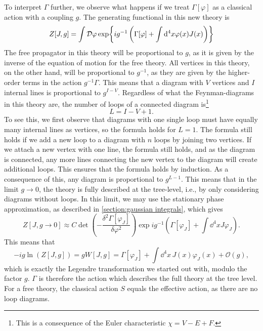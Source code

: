 To interpret $\Gamma$ further, we observe what happens if we treat $\Gamma[\varphi]$ as a classical action with a coupling $g$.
The generating functional in this new theory is
\begin{equation}
    \label{partition function with g}
    Z[J, g] = \int \mathcal{D} \varphi 
    \exp{ i g^{-1} \left( \Gamma[\varphi] + \int \dd^4x \varphi(x) J(x) \right) }
\end{equation}
The free propagator in this theory will be proportional to $g$, as it is given by the inverse of the equation of motion for the free theory.
All vertices in this theory, on the other hand, will be proportional to $g^{-1}$, as they are given by the higher-order terms in the action $g^{-1}\Gamma$.
This means that a diagram with $V$ vertices and $I$ internal lines is proportional to $g^{I-V}$.
Regardless of what the Feynman-diagrams in this theory are, the number of loops of a connected diagram is\footnote{This is a consequence of the Euler characteristic $\chi = V - E + F$.}
\begin{equation}
    \label{Number of loops}
    L = I - V + 1.
\end{equation}
To see this, we first observe that diagrams with one single loop must have equally many internal lines as vertices, so the formula holds for $L = 1$.
The formula still holds if we add a new loop to a diagram with $n$ loops by joining two vertices.
If we attach a new vertex with one line, the formula still holds, and as the diagram is connected, any more lines connecting the new vertex to the diagram will create additional loops.
This ensures that the formula holds by induction.
As a consequence of this, any diagram is proportional to $g^{L-1}$.
This means that in the limit $g \rightarrow 0$, the theory is fully described at the tree-level, i.e., by only considering diagrams without loops.
In this limit, we may use the stationary phase approximation, as described in \autoref{section:gaussian integrals}, which gives
\begin{equation}
    Z[J, g\rightarrow 0] \approx 
    C \det(- \frac{\delta^2 \Gamma[\varphi_J]}{\delta \varphi^2})
    \exp{i g^{-1} \left(\Gamma[\varphi_J] + \int \dd^4x J \varphi_J \right)  }.
\end{equation}
This means that
\begin{equation}
    -i g \ln(Z[J, g]) 
    = g W[J, g] 
    = \Gamma[\varphi_J] + \int \dd^4x\,  J(x) \varphi_J(x) + \mathcal{O}(g),
\end{equation}
which is exactly the Legendre transformation we started out with, modulo the factor $g$.
$\Gamma$ is therefore the action which describes the full theory at the tree level.
For a free theory, the classical action $S$ equals the effective action, as there are no loop diagrams.


